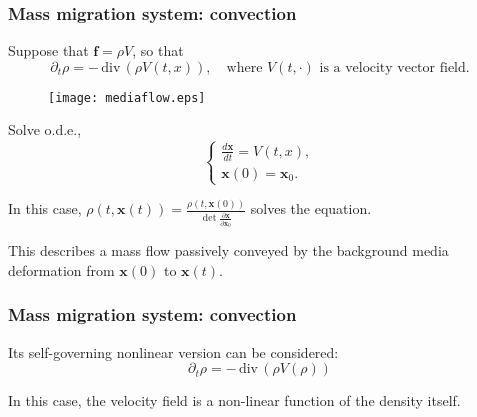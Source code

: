 \documentclass{beamer}
\def\div{\,\textrm{div}\,}
\begin{document}
\begin{frame}
 \frametitle{Mass migration system: convection}
 Suppose that $ \mathbf{f} = \rho V$, so that
 $$ \partial_t \rho = -\div( \rho V(t,x) ), \quad \text{where $V(t,\cdot)$ is a velocity vector field}. $$
    \begin{minipage}{0.6\linewidth}
    \begin{figure}
    \centering
    \texttt{[image: mediaflow.eps]}
    \end{figure}
    \end{minipage}    
    \hfill
    \begin{minipage}{0.3\linewidth}
    Solve o.d.e., 
    \begin{equation*}
        \left\{\begin{array}{l}
        \frac{d \mathbf{x}}{dt} = V(t,x),\\
        \mathbf{x}(0)= \mathbf{x}_0.
        \end{array}\right.
    \end{equation*}
    \end{minipage}

    \vspace{1em}
    In this case, $ \displaystyle\rho(t, \mathbf{x}(t)) = \frac{\rho(t, \mathbf{x}(0))}{ \det \frac{\partial \mathbf{x}}{\partial \mathbf{x}_0}}$ solves the equation.
    
    This describes a mass flow passively conveyed by the background media deformation from $ \mathbf{x}(0)$ to $ \mathbf{x}(t) $.
    
\end{frame}

\begin{frame}
 \frametitle{Mass migration system: convection}
 Its self-governing nonlinear version can be considered:
 $$ \partial_t \rho = -\div( \rho V(\rho) )$$

 In this case, the velocity field is a non-linear function of the density itself. 
\end{frame}
\end{document}
